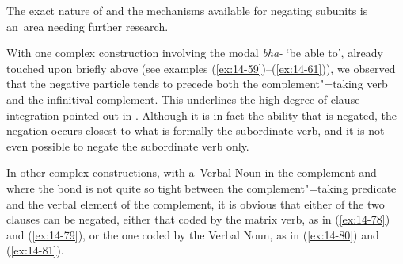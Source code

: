 The exact nature of and the mechanisms available for negating subunits is an~area needing further research.


 With one complex construction involving the modal \textit{bha-} `be able to', already touched upon briefly above (see examples (\ref{ex:14-59})--(\ref{ex:14-61})), we observed that the negative particle tends to precede both the complement"=taking verb and the infinitival complement. This underlines the high degree of clause integration pointed out in . Although it is in fact the ability that is negated, the negation occurs closest to what is formally the subordinate verb, and it is not even possible to negate the subordinate verb only.


In other complex constructions, with a~Verbal Noun in the complement and where the bond is not quite so tight between the complement"=taking predicate and the verbal element of the complement, it is obvious that either of the two clauses can be negated, either that coded by the matrix verb, as in (\ref{ex:14-78}) and (\ref{ex:14-79}), or the one coded by the Verbal Noun, as in (\ref{ex:14-80}) and (\ref{ex:14-81}). 

